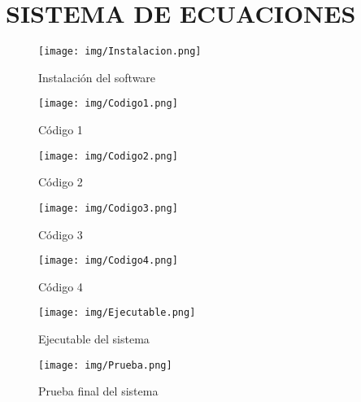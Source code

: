 \documentclass{article}
\begin{document}
	
	\section*{SISTEMA DE ECUACIONES}
	
	\begin{figure}[h!]
		\centering
		\texttt{[image: img/Instalacion.png]}
		\caption{Instalación del software}
	\end{figure}
	
	\begin{figure}[h!]
		\centering
		\texttt{[image: img/Codigo1.png]}
		\caption{Código 1}
	\end{figure}
	
	\begin{figure}[h!]
		\centering
		\texttt{[image: img/Codigo2.png]}
		\caption{Código 2}
	\end{figure}
	
	\begin{figure}[h!]
		\centering
		\texttt{[image: img/Codigo3.png]}
		\caption{Código 3}
	\end{figure}
	
	\begin{figure}[h!]
		\centering
		\texttt{[image: img/Codigo4.png]}
		\caption{Código 4}
	\end{figure}
	
	\begin{figure}[h!]
		\centering
		\texttt{[image: img/Ejecutable.png]}
		\caption{Ejecutable del sistema}
	\end{figure}
	
	\begin{figure}[h!]
		\centering
		\texttt{[image: img/Prueba.png]}
		\caption{Prueba final del sistema}
	\end{figure}
	
\end{document}
